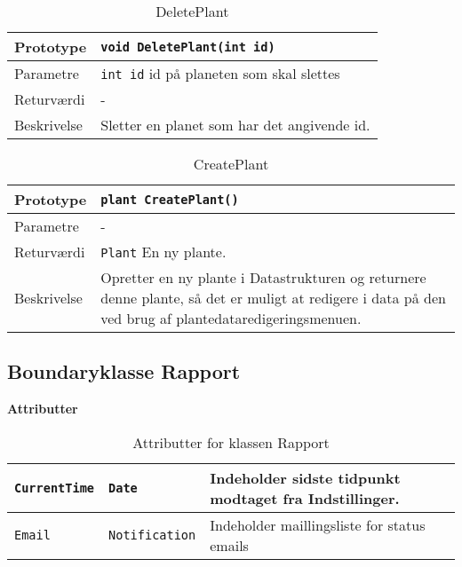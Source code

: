 \begin{table}[h]
\begin{tabularx}{\textwidth}{| >{\raggedright\arraybackslash}p{2.5 cm} | >{\raggedright\arraybackslash}X |} \hline
Prototype & \texttt{void DeletePlant(int id)} \\\hline
Parametre & \texttt{int id} \newline
id på planeten som skal slettes \\\hline
Returværdi & - \\\hline
Beskrivelse & Sletter en planet som har det angivende id. \\\hline
\end{tabularx}
\caption{DeletePlant}
\label{table:DeletePlant}
\end{table}

\begin{table}[h]
\begin{tabularx}{\textwidth}{| >{\raggedright\arraybackslash}p{2.5 cm} | >{\raggedright\arraybackslash}X |} \hline
Prototype & \texttt{plant CreatePlant()} \\\hline
Parametre & - \\\hline
Returværdi & \texttt{Plant} \newline
En ny plante. \\\hline
Beskrivelse & Opretter en ny plante i Datastrukturen og returnere denne plante, så det er muligt at redigere i data på den ved brug af plantedataredigeringsmenuen. \\\hline
\end{tabularx}
\caption{CreatePlant}
\label{table:CreatePlant}
\end{table}

\clearpage

\subsection{Boundaryklasse Rapport}

\textbf{Attributter}

\begin{table}[h]
\begin{tabularx}{\textwidth}{| >{\raggedright\arraybackslash}X | >{\raggedright\arraybackslash}X | >{\raggedright\arraybackslash}p{10 cm} |} \hline
\texttt{CurrentTime} & \texttt{Date} & Indeholder sidste tidpunkt modtaget fra Indstillinger. \\\hline
\texttt{Email} & \texttt{Notification} & Indeholder maillingsliste for status emails \\\hline
\end{tabularx}
\caption{Attributter for klassen Rapport}
\label{table:Rapport_attributter}
\end{table}

